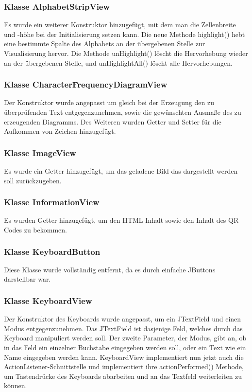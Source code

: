 \documentclass{article}
\begin{document}
	\subsubsection{Klasse AlphabetStripView}
	
	Es wurde ein weiterer Konstruktor hinzugefügt, mit dem man die Zellenbreite und -höhe
	bei der Initialisierung setzen kann. Die neue Methode highlight() hebt eine bestimmte
	Spalte des Alphabets an der übergebenen Stelle zur Visualisierung hervor. Die Methode 
	unHighlight() löscht die Hervorhebung wieder an der übergebenen Stelle, und unHighlightAll() 
	löscht alle Hervorhebungen.

	\subsubsection{Klasse CharacterFrequencyDiagramView}

	Der Konstruktor wurde angepasst um gleich bei der Erzeugung den zu überprüfenden Text
	entgegenzunehmen, sowie die gewünschten Ausmaße des zu erzeugenden Diagramms. Des Weiteren
	wurden Getter und Setter für die Aufkommen von Zeichen hinzugefügt.

	\subsubsection{Klasse ImageView}

	Es wurde ein Getter hinzugefügt, um das geladene Bild das dargestellt werden soll zurückzugeben.

	\subsubsection{Klasse InformationView}

	Es wurden Getter hinzugefügt, um den HTML Inhalt sowie den Inhalt des QR Codes zu bekommen.

	\subsubsection{Klasse KeyboardButton}

	Diese Klasse wurde vollständig entfernt, da es durch einfache JButtons darstellbar war.

	\subsubsection{Klasse KeyboardView}

	Der Konstruktor des Keyboards wurde angepasst, um ein JTextField und einen Modus entgegenzunehmen.
	Das JTextField ist dasjenige Feld, welches durch das Keyboard manipuliert werden soll. Der zweite
	Parameter, der Modus, gibt an, ob in das Feld ein einzelner Buchstabe eingegeben werden soll, oder
	ein Text wie ein Name eingegeben werden kann. KeyboardView implementiert nun jetzt auch die
	ActionListener-Schnittstelle und implementiert ihre actionPerformed() Methode, um Tastendrücke
	des Keyboards abarbeiten und an das Textfeld weiterleiten zu können.
\end{document}
